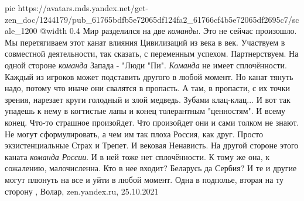\ifcmt
   pic https://avatars.mds.yandex.net/get-zen_doc/1244179/pub_61765bdfb5e72065df124fa2_61766cf4b5e72065df2695c7/scale_1200
	 @width 0.4
\fi
Мир разделился на две \emph{команды}. Это не сейчас произошло. Мы перетягиваем этот
канат влияния Цивилизаций из века в век. Участвуем в совместной деятельности,
так сказать, с переменным успехом. Партнерствуем.  На одной стороне
\emph{команда} Запада - "Люди "Пи". \emph{Команда} не имеет сплочённости.
Каждый из игроков может подставить другого в любой момент. Но канат тянуть
надо, потому что иначе они свалятся в пропасть. А там, в пропасти, с их точки
зрения, нарезает круги голодный и злой медведь. Зубами клац-клац... И вот так
упадешь к нему в когтистые лапы и конец толерантным "ценностям". И всему конец.
Что-то страшное произойдет. Что произойдет они и сами толком не знают. Не могут
сформулировать, а чем им так плоха Россия, как друг. Просто экзистенциальные
Страх и Трепет. И вековая Ненависть.  На другой стороне этого каната
\emph{команда России}. И в ней тоже нет сплочённости. К тому же она, к
сожалению, малочисленна. Кто в нее входит? Беларусь да Сербия? И те и другие
могут плюнуть на все и уйти в любой момент. Одна в подполье, вторая на ту
сторону
, Волар, zen.yandex.ru, 25.10.2021
